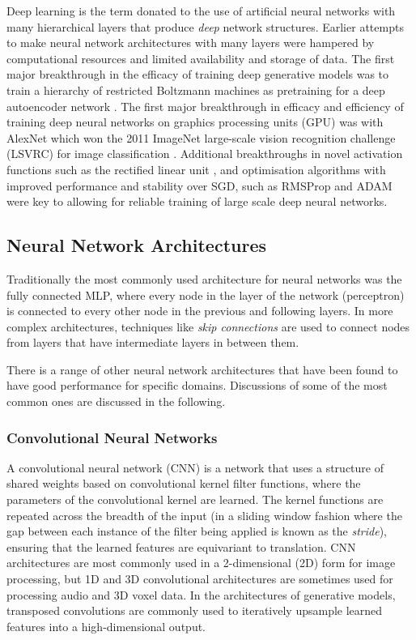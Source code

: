 Deep learning is the term donated to the use of artificial neural networks with many hierarchical layers that produce \textit{deep} network structures. 
Earlier attempts to make neural network architectures with many layers were hampered by computational resources and limited availability and storage of data. 
The first major breakthrough in the efficacy of training deep generative models was to train a hierarchy of restricted Boltzmann machines \citep{ackley1985learning} as pretraining for a deep autoencoder network \citep{hinton2006reducing}. 
The first major breakthrough in efficacy and efficiency of training deep neural networks on graphics processing units (GPU) was with AlexNet \citep{krizhevsky2012imagenet} which won the 2011 ImageNet large-scale vision recognition challenge (LSVRC) for image classification \citep{russakovsky2015imagenet}. 
Additional breakthroughs in novel activation functions such as the rectified linear unit \citep{nair2010rectified}, and optimisation algorithms with improved performance and stability over SGD, such as RMSProp \citep{tieleman2012lecture} and ADAM \citep{kingma2015adam} were key to allowing for reliable training of large scale deep neural networks. 

\subsection{Neural Network Architectures}

Traditionally the most commonly used architecture for neural networks was the fully connected MLP, where every node in the layer of the network (perceptron) is connected to every other node in the previous and following layers. 
In more complex architectures, techniques like \textit{skip connections} are used to connect nodes from layers that have intermediate layers in between them. 

There is a range of other neural network architectures that have been found to have good performance for specific domains. 
Discussions of some of the most common ones are discussed in the following.

\subsubsection{Convolutional Neural Networks}

A convolutional neural network (CNN) \citep{fukushima1982neocognitron} is a network that uses a structure of shared weights based on convolutional kernel filter functions, where the parameters of the convolutional kernel are learned. 
The kernel functions are repeated across the breadth of the input (in a sliding window fashion where the gap between each instance of the filter being applied is known as the \textit{stride}), ensuring that the learned features are equivariant to translation. 
CNN architectures are most commonly used in a 2-dimensional (2D) form for image processing, but 1D and 3D convolutional architectures are sometimes used for processing audio and 3D voxel data. 
In the architectures of generative models, transposed convolutions are commonly used to iteratively upsample learned features into a high-dimensional output.

